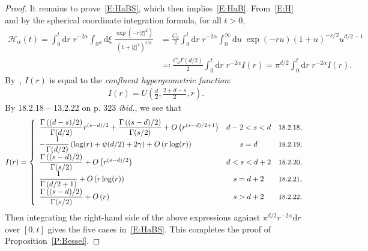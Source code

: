 \documentclass[a4paper,11pt]{article}%
\theoremstyle{plain}
\theoremstyle{definition}
\numberwithin{equation}{section}
\newcommand{\R}{\mathbb{R}}
\newcommand{\ud}{\ensuremath{\mathrm{d}}}
\begin{document}
\begin{proof}
  It remains to prove~\eqref{E:HaBS}, which then implies~\eqref{E:HaB}. From~\eqref{E:H} and by the
  spherical coordinate integration formula, for all $t>0$,
  \begin{align*}
    \mathcal{H}_{\alpha}(t)
      = \int_0^t \ud r \; r^{-2\alpha} \int_{\R^d} \ud \xi \; \frac{\exp(-r|\xi|^2)}{(1+|\xi|^2)^{s/2}}
    & = \frac{C_d}{2} \int_0^t \ud r \; r^{-2\alpha} \int_0^\infty \ud u \; \exp(-r u)(1+u)^{-s/2} u^{d/2-1} \\
    & \eqqcolon \frac{C_d \Gamma\left(d/2\right)}{2} \int_0^t \ud r \; r^{-2\alpha} I(r) = \pi^{d/2}\int_0^t \ud r \; r^{-2\alpha} I(r).
  \end{align*}
  By~\cite[13.4.4 on p.326]{olver.lozier.ea:10:nist}, $I(r)$ is equal to the \textit{confluent
  hypergeometric function}:
  \begin{align}\label{E:ConHyGe}
    I(r) =U\left(\frac{d}{2},\frac{2+d-s}{2},r\right).
  \end{align}
  By 18.2.18 -- 13.2.22 on p. 323 \textit{ibid.}, we see that \renewcommand{\arraystretch}{2}
  \begin{align*}
    I(r) = \left\{
      \begin{array}{lcl}
        \dfrac{\Gamma\left((d-s)/2\right)}{\Gamma(d/2)}r^{(s-d)/2}+\dfrac{\Gamma\left((s-d)/2\right)}{\Gamma(s/2)} + O\left(r^{(s-d)/2+1}\right) & d-2<s<d & \text{\small 18.2.18}, \\
        -\dfrac{1}{\Gamma(d/2)}\left(\log(r) + \psi(d/2) + 2\gamma \right) +O\left(r\log(r)\right)                                               & s=d     & \text{\small 18.2.19}, \\
        \dfrac{\Gamma\left((s-d)/2\right)}{\Gamma(s/2)} + O\left(r^{(s-d)/2}\right)                                                              & d<s<d+2 & \text{\small 18.2.20}, \\
        \dfrac{1}{\Gamma\left(d/2+1\right)} + O\left(r\log(r)\right)                                                                             & s=d+2   & \text{\small 18.2.21}, \\
        \dfrac{\Gamma\left((s-d)/2\right)}{\Gamma(s/2)} + O\left(r\right)                                                                        & s>d+2   & \text{\small 18.2.22}. \\
      \end{array}
      \right.
  \end{align*}
  Then integrating the right-hand side of the above expressions against $\pi^{d/2}r^{-2\alpha}\ud r$
  over $[0,t]$ gives the five cases in~\eqref{E:HaBS}. This completes the proof of
  Proposition~\ref{P:Bessel}.
\end{proof}
\end{document}
